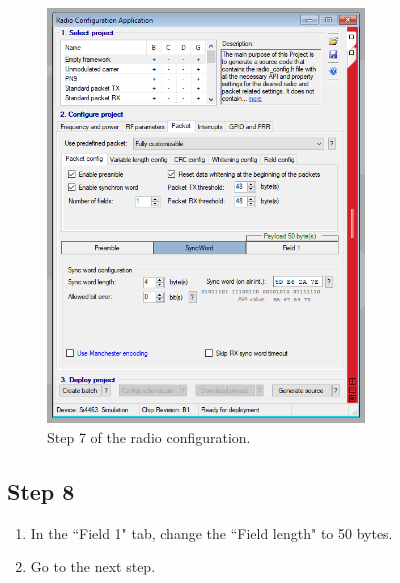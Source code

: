 \documentclass[12pt]{book}
\begin{document}
\begin{appendices}
\begin{figure}[!h]
	\begin{center}
		\includegraphics[width=0.75\textwidth]{figures/wds-tutorial-7.png}
		\caption{Step 7 of the radio configuration.}
		\label{fig:wds-tutorial-step-7}
	\end{center}
\end{figure}

\subsection{Step 8}

\begin{enumerate}
    \item In the ``Field 1" tab, change the ``Field length" to 50 bytes.
    \item Go to the next step.
\end{enumerate}


\end{appendices}
\end{document}
